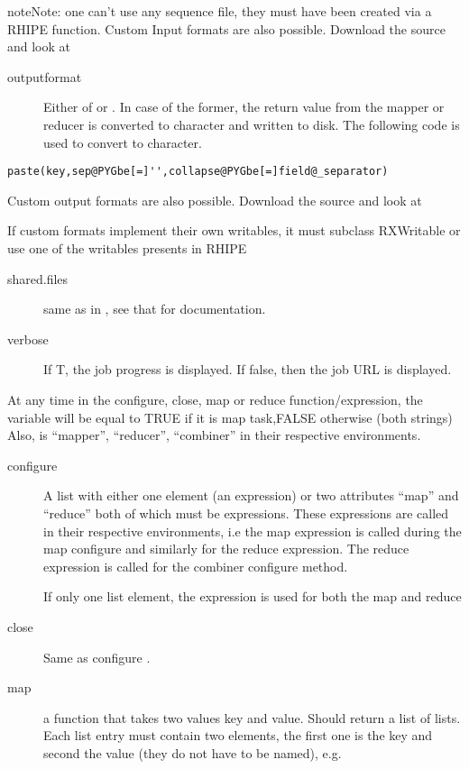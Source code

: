 \documentclass[letterpaper,10pt,english]{manual}
\begin{document}
\begin{notice}{note}{Note:}
one can't use any sequence file, they must have been created via a RHIPE function. Custom Input formats are also possible. Download the source and look at 
\end{notice}
\begin{description}
\item[outputformat]
Either of  or . In case of the former, the return value from the mapper or reducer is converted to character and written to disk. The following code is used to convert to character.

\end{description}

\begin{Verbatim}[commandchars=@\[\]]
paste(key,sep@PYGbe[=]'',collapse@PYGbe[=]field@_separator)
\end{Verbatim}

Custom output formats are also possible. Download the source and look at 

If custom formats implement their own writables, it must subclass RXWritable or use one of the writables presents in RHIPE
\begin{description}
\item[shared.files]
same as in , see that for documentation.

\item[verbose]
If T, the job progress is displayed. If false, then the job URL is displayed.

\end{description}

At any time in the configure, close, map or reduce function/expression, the variable  will be equal to TRUE if it is map task,FALSE otherwise (both strings) Also,  is ``mapper'', ``reducer'', ``combiner'' in their respective environments.
\begin{description}
\item[configure]
A list with either one element (an expression) or two attributes ``map'' and ``reduce'' both of which must be expressions. These expressions are called in their respective environments, i.e the map expression is called during the map configure and similarly for the reduce expression. The reduce expression is called for the combiner configure method.

If only one list element, the expression is used for both the map and reduce

\item[close]
Same as configure .

\item[map]
a function that takes two values key and value. Should return a list of
lists. Each list entry must contain two elements, the first one is the key
and second the value (they do not have to be named), e.g.

\end{description}
\end{document}
